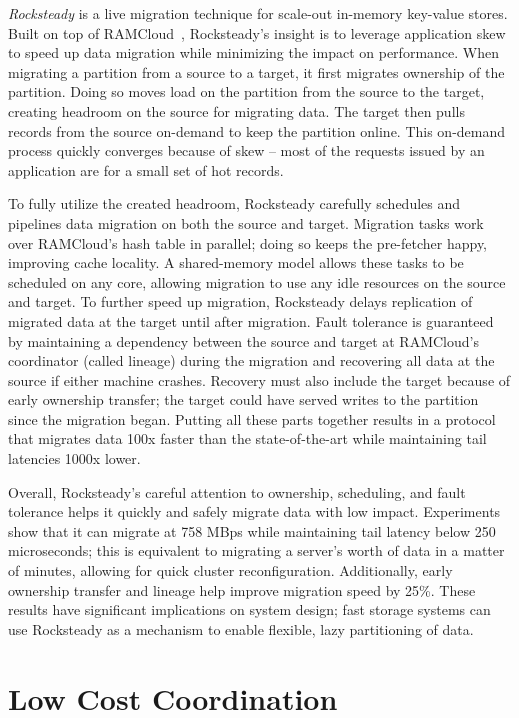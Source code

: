 \emph{Rocksteady} is a live migration technique for scale-out
in-memory key-value stores.
%
Built on top of RAMCloud~\cite{ramcloud}, Rocksteady’s insight is to
leverage application skew to speed up data migration while minimizing
the impact on performance.
%
When migrating a partition from a source to a target, it first migrates
ownership of the partition.
%
Doing so moves load on the partition from the source to the target, creating
headroom on the source for migrating data.
%
The target then pulls records from the source
on-demand to keep the partition online.
%
This on-demand process quickly converges because of skew –
most of the requests issued by an application are for a small set of hot
records.

To fully utilize the created headroom, Rocksteady carefully schedules and
pipelines data migration on both the source and target.
%
Migration tasks work over RAMCloud’s hash table in parallel;
doing so keeps the pre-fetcher happy, improving cache locality.
%
A shared-memory model allows these tasks to be scheduled on any core,
allowing migration to use any idle resources on the source and target.
%
To further speed up migration, Rocksteady delays
replication of migrated data at the target until after migration.
%
Fault tolerance is guaranteed by maintaining a dependency
between the source and target at RAMCloud’s coordinator (called lineage)
during the migration and recovering all data at the source if either
machine crashes.
%
Recovery must also include the target because of early
ownership transfer; the target could have served writes
to the partition since the migration began.
%
Putting all these parts
together results in a protocol that migrates data 100x faster than the
state-of-the-art while maintaining tail latencies 1000x lower.

Overall, Rocksteady's careful attention to ownership, scheduling, and
fault tolerance helps it quickly and safely migrate data with
low impact.
%
Experiments show that it can migrate at 758 MBps
while maintaining tail latency below 250 microseconds; this is
equivalent to migrating a server's worth of data in a matter of minutes,
allowing for quick cluster reconfiguration.
%
Additionally, early ownership transfer and
lineage help improve migration speed by 25\%.
%
These results have
significant implications on system design; fast storage systems can use
Rocksteady as a mechanism to enable flexible, lazy partitioning of
data.

\section{Low Cost Coordination}


